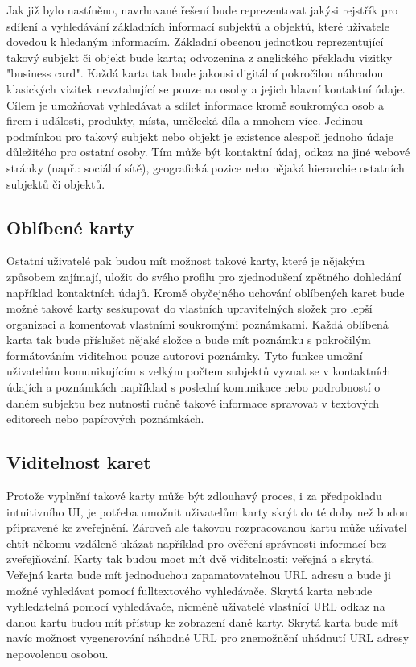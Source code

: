 
Jak již bylo nastíněno, navrhované řešení bude reprezentovat jakýsi rejstřík pro sdílení a vyhledávání základních informací
subjektů a objektů, které uživatele dovedou k hledaným informacím.
Základní obecnou jednotkou reprezentující takový subjekt či objekt bude karta; odvozenina z anglického překladu vizitky "business card".
Každá karta tak bude jakousi digitální pokročilou náhradou klasických vizitek nevztahující se pouze na osoby a jejich
hlavní kontaktní údaje.
Cílem je umožňovat vyhledávat a sdílet informace kromě soukromých osob a firem i události, produkty, místa, umělecká díla a mnohem více.
Jedinou podmínkou pro takový subjekt nebo objekt je existence alespoň jednoho údaje důležitého pro ostatní osoby.
Tím může být kontaktní údaj, odkaz na jiné webové stránky (např.: sociální sítě), geografická pozice nebo
nějaká hierarchie ostatních subjektů či objektů.

	\subsection{Oblíbené karty}

	Ostatní uživatelé pak budou mít možnost takové karty, které je nějakým způsobem zajímají, uložit do svého profilu pro
	zjednodušení zpětného dohledání například kontaktních údajů.
	Kromě obyčejného uchování oblíbených karet bude možné takové karty seskupovat do vlastních upravitelných složek pro
	lepší organizaci a komentovat vlastními soukromými poznámkami.
	Každá oblíbená karta tak bude příslušet nějaké složce a bude mít poznámku s pokročilým formátováním viditelnou pouze
	autorovi poznámky.
	Tyto funkce umožní uživatelům komunikujícím s velkým počtem subjektů vyznat se v kontaktních údajích a poznámkách
	například s poslední komunikace nebo podrobností o daném subjektu bez nutnosti ručně takové informace spravovat v
	textových editorech nebo papírových poznámkách.

	\subsection{Viditelnost karet}

	Protože vyplnění takové karty může být zdlouhavý proces, i za předpokladu intuitivního \ac{UI}, je potřeba umožnit
	uživatelům karty skrýt do té doby než budou připravené ke zveřejnění.
	Zároveň ale takovou rozpracovanou kartu může uživatel chtít někomu vzdáleně ukázat například pro ověření správnosti informací
	bez zveřejňování.
	Karty tak budou moct mít dvě viditelnosti: veřejná a skrytá.
	Veřejná karta bude mít jednoduchou zapamatovatelnou \ac{URL} adresu a bude ji možné vyhledávat pomocí fulltextového vyhledávače.
	Skrytá karta nebude vyhledatelná pomocí vyhledávače, nicméně uživatelé vlastnící \ac{URL} odkaz na danou kartu budou mít přístup
	ke zobrazení dané karty.
	Skrytá karta bude mít navíc možnost vygenerování náhodné \ac{URL} pro znemožnění uhádnutí \ac{URL} adresy nepovolenou osobou.

